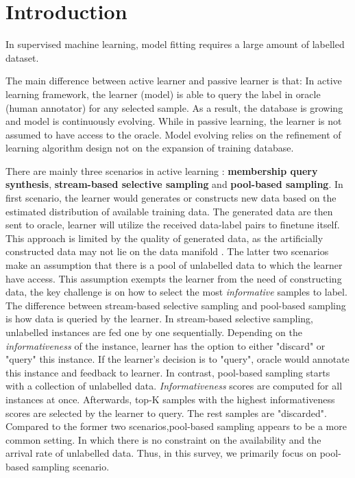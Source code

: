 \section{Introduction}%

In supervised machine learning, model fitting requires a large amount of labelled dataset. 

The main difference between active learner and passive learner is that: 
In active learning framework, the learner (model) is able to query the label in oracle (human annotator) for any selected sample. 
As a result, the database is growing and model is continuously evolving. 
While in passive learning, the learner is not assumed to have access to the oracle. 
Model evolving relies on the refinement of learning algorithm design not on the expansion of training database. 

There are mainly three scenarios in active learning \citep{settles2009active}: \textbf{membership query synthesis}, \textbf{stream-based selective sampling} and \textbf{pool-based sampling}. 
In first scenario, the learner would generates or constructs new data based on the estimated distribution of available training data. 
The generated data are then sent to oracle, learner will utilize the received data-label pairs to finetune itself. 
This approach is limited by the quality of generated data, as the artificially constructed data may not lie on the data manifold \citep{baum1992query}. 
The latter two scenarios make an assumption that there is a pool of unlabelled data to which the learner have access. 
This assumption exempts the learner from the need of constructing data, the key challenge is on how to select the most \textit{informative} samples to label. 
The difference between stream-based selective sampling and pool-based sampling is how data is queried by the learner. 
In stream-based selective sampling, unlabelled instances are fed one by one sequentially. Depending on the \textit{informativeness} of the instance, learner has the option to either "discard" or "query" this instance. If the learner's decision is to "query", oracle would annotate this instance and feedback to learner. 
In contrast, pool-based sampling starts with a collection of unlabelled data. \textit{Informativeness} scores are computed for all instances at once. Afterwards, top-K samples with the highest informativeness scores are selected by the learner to query. The rest samples are "discarded". 
Compared to the former two scenarios,pool-based sampling appears to be a more common setting. In which there is no constraint on the availability and the arrival rate of unlabelled data. Thus, in this survey, we primarily focus on pool-based sampling scenario. 

